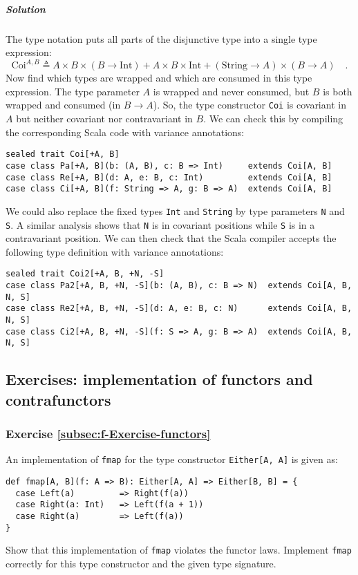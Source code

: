 \subparagraph{Solution}

The type notation puts all parts of the disjunctive type into a single
type expression:
\[
\text{Coi}^{A,B}\triangleq A\times B\times(B\rightarrow\text{Int})+A\times B\times\text{Int}+(\text{String}\rightarrow A)\times(B\rightarrow A)\quad.
\]
Now find which types are wrapped and which are consumed in this type
expression. The type parameter $A$ is wrapped and never consumed,
but $B$ is both wrapped and consumed (in $B\rightarrow A$). So,
the type constructor \lstinline!Coi! is covariant in $A$ but neither
covariant nor contravariant in $B$. We can check this by compiling
the corresponding Scala code with variance annotations:
\begin{lstlisting}
sealed trait Coi[+A, B]
case class Pa[+A, B](b: (A, B), c: B => Int)     extends Coi[A, B]
case class Re[+A, B](d: A, e: B, c: Int)         extends Coi[A, B]
case class Ci[+A, B](f: String => A, g: B => A)  extends Coi[A, B]
\end{lstlisting}
We could also replace the fixed types \lstinline!Int! and \lstinline!String!
by type parameters \lstinline!N! and \lstinline!S!. A similar analysis
shows that \lstinline!N! is in covariant positions while \lstinline!S!
is in a contravariant position. We can then check that the Scala compiler
accepts the following type definition with variance annotations:
\begin{lstlisting}
sealed trait Coi2[+A, B, +N, -S]
case class Pa2[+A, B, +N, -S](b: (A, B), c: B => N)  extends Coi[A, B, N, S]
case class Re2[+A, B, +N, -S](d: A, e: B, c: N)      extends Coi[A, B, N, S]
case class Ci2[+A, B, +N, -S](f: S => A, g: B => A)  extends Coi[A, B, N, S]
\end{lstlisting}


\subsection{Exercises: implementation of functors and contrafunctors}

\subsubsection{Exercise \label{subsec:f-Exercise-functors}\ref{subsec:f-Exercise-functors}}

An implementation of \lstinline!fmap! for the type constructor \lstinline!Either[A, A]!
is given as:
\begin{lstlisting}
def fmap[A, B](f: A => B): Either[A, A] => Either[B, B] = {
  case Left(a)         => Right(f(a))
  case Right(a: Int)   => Left(f(a + 1))
  case Right(a)        => Left(f(a))
}
\end{lstlisting}
Show that this implementation of \lstinline!fmap! violates the functor
laws. Implement \lstinline!fmap! correctly for this type constructor
and the given type signature.

